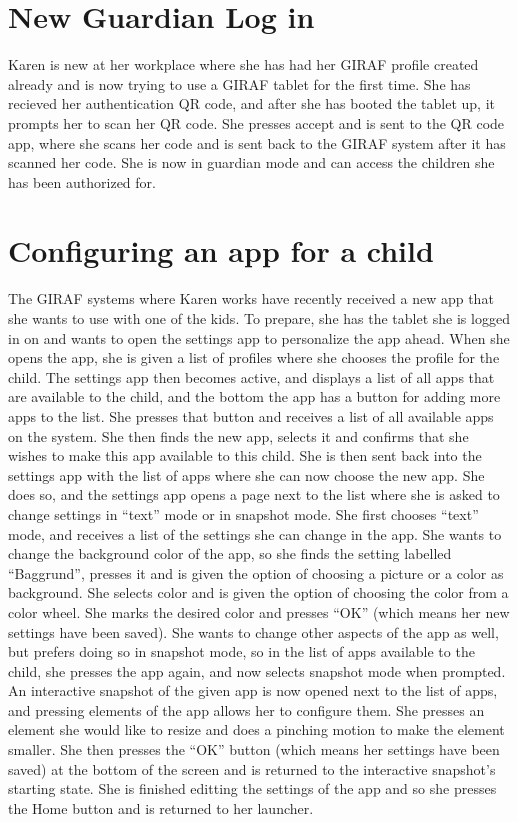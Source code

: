 \section{New Guardian Log in}
Karen is new at her workplace where she has had her GIRAF profile created already and is now trying to use a GIRAF tablet for the first time. 
She has recieved her authentication QR code, and after she has booted the tablet up, it prompts her to scan her QR code. 
She presses accept and is sent to the QR code app, where she scans her code and is sent back to the GIRAF system after it has scanned her code. 
She is now in guardian mode and can access the children she has been authorized for.

\section{Configuring an app for a child}
The GIRAF systems where Karen works have recently received a new app that she wants to use with one of the kids. 
To prepare, she has the tablet she is logged in on and wants to open the settings app to personalize the app ahead. 
When she opens the app, she is given a list of profiles where she chooses the profile for the child. \newline
The settings app then becomes active, and displays a list of all apps that are available to the child, and the bottom the app has a button for adding more apps to the list. 
She presses that button and receives a list of all available apps on the system. 
She then finds the new app, selects it and confirms that she wishes to make this app available to this child.
She is then sent back into the settings app with the list of apps where she can now choose the new app. 
She does so, and the settings app opens a page next to the list where she is asked to change settings in "`text"' mode or in snapshot mode. \newline
She first chooses "`text"' mode, and receives a list of the settings she can change in the app. 
She wants to change the background color of the app, so she finds the setting labelled "`Baggrund"', presses it and is given the option of choosing a picture or a color as background. 
She selects color and is given the option of choosing the color from a color wheel. 
She marks the desired color and presses "`OK"' (which means her new settings have been saved). \newline
She wants to change other aspects of the app as well, but prefers doing so in snapshot mode, so in the list of apps available to the child, she presses the app again, and now selects snapshot mode when prompted.
An interactive snapshot of the given app is now opened next to the list of apps, and pressing elements of the app allows her to configure them. 
She presses an element she would like to resize and does a pinching motion to make the element smaller. 
She then presses the "`OK"' button (which means her settings have been saved) at the bottom of the screen and is returned to the interactive snapshot's starting state.
She is finished editting the settings of the app and so she presses the Home button and is returned to her launcher.

